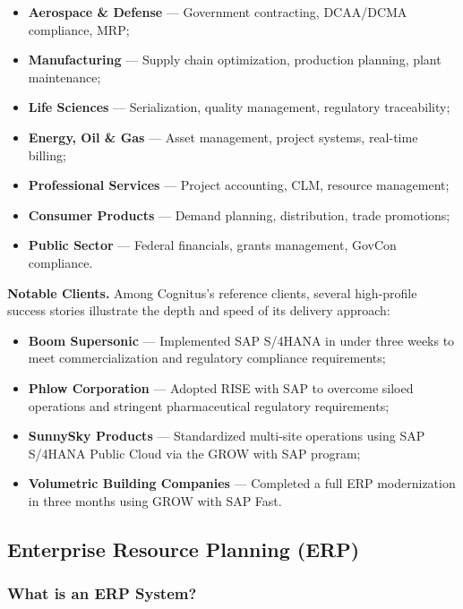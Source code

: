 \begin{itemize}
    \item \textbf{Aerospace \& Defense} --- Government contracting, DCAA/DCMA compliance, MRP;
    \item \textbf{Manufacturing} --- Supply chain optimization, production planning, plant maintenance;
    \item \textbf{Life Sciences} --- Serialization, quality management, regulatory traceability;
    \item \textbf{Energy, Oil \& Gas} --- Asset management, project systems, real-time billing;
    \item \textbf{Professional Services} --- Project accounting, CLM, resource management;
    \item \textbf{Consumer Products} --- Demand planning, distribution, trade promotions;
    \item \textbf{Public Sector} --- Federal financials, grants management, GovCon compliance.
\end{itemize}

\textbf{Notable Clients.}
Among Cognitus's reference clients, several high-profile success stories illustrate the depth and speed of its delivery approach:

\begin{itemize}
    \item \textbf{Boom Supersonic} --- Implemented SAP S/4HANA in under three weeks to meet commercialization and regulatory compliance requirements;
    \item \textbf{Phlow Corporation} --- Adopted RISE with SAP to overcome siloed operations and stringent pharmaceutical regulatory requirements;
    \item \textbf{SunnySky Products} --- Standardized multi-site operations using SAP S/4HANA Public Cloud via the GROW with SAP program;
    \item \textbf{Volumetric Building Companies} --- Completed a full ERP modernization in three months using GROW with SAP Fast.
\end{itemize}

\subsection{Enterprise Resource Planning (ERP)}

\subsubsection{What is an ERP System?}

